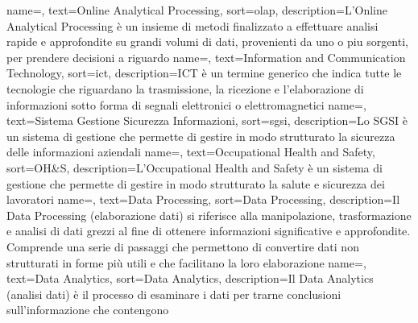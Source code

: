  {
    name=,
    text=Online Analytical Processing,
    sort=olap,
    description={L'Online Analytical Processing è un insieme di metodi finalizzato a effettuare analisi rapide e approfondite su grandi volumi di dati, provenienti da uno o piu sorgenti, per prendere decisioni a riguardo}
}
 {
    name=,
    text=Information and Communication Technology,
    sort=ict,
    description={ICT è un termine generico che indica tutte le tecnologie che riguardano la trasmissione, la ricezione e l'elaborazione di informazioni sotto forma di segnali elettronici o elettromagnetici}
}
 {
    name=,
    text=Sistema Gestione Sicurezza Informazioni,
    sort=sgsi,
    description={Lo SGSI è un sistema di gestione che permette di gestire in modo strutturato la sicurezza delle informazioni aziendali}
}
 {
    name=,
    text=Occupational Health and Safety,
    sort=OH\&S,
    description={L'Occupational Health and Safety è un sistema di gestione che permette di gestire in modo strutturato la salute e sicurezza dei lavoratori}
}
{
    name=,
    text=Data Processing,
    sort=Data Processing,
    description={Il Data Processing (elaborazione dati) si riferisce alla manipolazione, trasformazione e analisi di dati grezzi al fine di ottenere informazioni significative e approfondite. Comprende una serie di passaggi che permettono di convertire dati non strutturati in forme più utili e che facilitano la loro elaborazione}
}
{
    name=,
    text=Data Analytics,
    sort=Data Analytics,
    description={Il Data Analytics (analisi dati) è il processo di esaminare i dati per trarne conclusioni sull'informazione che contengono}
}
